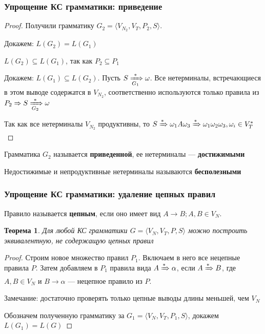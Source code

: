 \documentclass{beamer}
\newtheorem{rutheorem}{Теорема}
\newcommand{\derive}[0]{\xRightarrow[]{*}}
\newcommand{\deriveg}[1]{\xRightarrow[#1]{*}}
\begin{document}
\begin{frame}[fragile]
  \transwipe[direction=90]
  \frametitle{Упрощение КС грамматики: приведение}
   \begin{proof}
   Получили грамматику $G_2 = \langle V_{N_2}, V_T, P_2, S\rangle$. 

   Докажем: $L(G_2) = L(G_1)$
   
   $L(G_2) \subseteq L(G_1)$, так как $P_2 \subseteq P_1$
   
   Докажем: $L(G_1) \subseteq L(G_2)$. Пусть $S \deriveg{G_1} \omega$. Все нетерминалы, встречающиеся в этом выводе содержатся в $V_{N_2}$, соответственно используются только правила из $ P_2 \Rightarrow S \deriveg{G_2} \omega $
   
   Так как все нетерминалы $V_{N_2}$ продуктивны, то  $S \derive \omega_1 A \omega_3 \derive \omega_1 \omega_2 \omega_3, \omega_i \in V_T^*$
   
   
   \end{proof}
   
   Грамматика $G_2$ называется \textbf{приведенной}, ее нетерминалы --- \textbf{достижимыми}
   
   Недостижимые и непродуктивные нетерминалы называются \textbf{бесполезными}
\end{frame}

\begin{frame}[fragile]
  \transwipe[direction=90]
  \frametitle{Упрощение КС грамматики: удаление цепных правил}
  Правило называется \textbf{цепным}, если оно имеет вид $A \rightarrow B; A, B \in V_N$.
  
  \begin{rutheorem}
    Для любой КС грамматики $G=\langle V_N, V_T, P, S \rangle$ можно построить эквивалентную, не содержащую цепных правил
  \end{rutheorem}
  
   \begin{proof}
   Строим новое множество правил $P_1$. Включаем в него все нецепные правила  $P$. Затем добавляем в $P_1$ правила вида $A \derive \alpha$, если $A \derive B$, где $A, B \in V_N$ и $B \rightarrow \alpha$ --- нецепное правило из $P$.
   
   Замечание: достаточно проверять только цепные выводы длины меньшей, чем $V_N$
   
   Обозначем полученную грамматику за $G_1=\langle V_N, V_T, P_1, S \rangle$, докажем $L(G_1)=L(G)$
      \end{proof}
\end{frame} 
   
\end{document}

